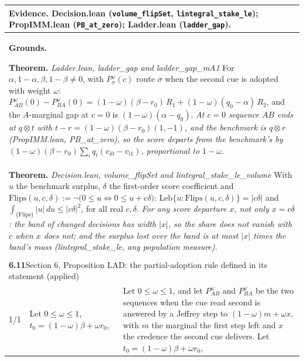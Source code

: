 \documentclass[10pt]{article}
\theoremstyle{definition}
\newlength{\fullw}\setlength{\fullw}{25.9cm}
\newcommand{\entryhead}[2]{\multicolumn{3}{|l|}{\rule{0pt}{2.6ex}\large\textbf{#1}\quad #2} \\ \hline}
\begin{document}
{\begin{longtable}{|p{0.9cm}|p{12.2cm}|p{12.2cm}|}
\multicolumn{3}{|p{\fullw}|}{\textbf{Evidence.} Decision.lean (\texttt{volume\_flipSet}, \texttt{lintegral\_stake\_le}); PropIMM.lean (\texttt{PB\_at\_zero}); Ladder.lean (\texttt{ladder\_gap}).} \\ \hline
\multicolumn{3}{|p{\fullw}|}{\textbf{Grounds.}\par \textbf{Theorem.} \textit{Ladder.lean, ladder\_gap and ladder\_gap\_mA1} \newline For $\alpha,1-\alpha,\beta,1-\beta\neq0$, with $P^{\omega}_{\sigma}(c)$ route $\sigma$ when the
second cue is adopted with weight $\omega$:
$P^{\omega}_{AB}(0)-P^{\omega}_{BA}(0)=(1-\omega)(\beta-r_0)\,R_1+(1-\omega)(q_0-\alpha)\,R_2$, and
the $A$-marginal gap at $c=0$ is $(1-\omega)(\alpha-q_0)$. \newline \textit{At $c=0$ sequence $AB$ ends at $q\otimes t$ with $t-r=(1-\omega)(\beta-r_0)(1,-1)$, and the benchmark is $q\otimes r$ (PropIMM.lean, PB\_at\_zero), so the score departs from the benchmark's by $(1-\omega)(\beta-r_0)\sum_i q_i(v_{i0}-v_{i1})$, proportional to $1-\omega$.}} \\
\multicolumn{3}{|p{\fullw}|}{\textbf{Theorem.} \textit{Decision.lean, volume\_flipSet and lintegral\_stake\_le\_volume} \newline With $u$ the benchmark surplus, $\delta$ the first-order score
coefficient and $\mathrm{Flips}(u,c,\delta) := \neg\big(0\le u \iff 0\le u + c\delta\big)$:
$\mathrm{Leb}\{u : \mathrm{Flips}(u,c,\delta)\} = |c\delta|$ and
$\int_{\{\mathrm{Flips}\}} |u|\,du \le |c\delta|^2$, for all real $c,\delta$. \newline \textit{For any score departure $x$, not only $x=c\delta$: the band of changed decisions has width $|x|$, so the share does not vanish with $c$ when $x$ does not; and the surplus lost over the band is at most $|x|$ times the band's mass (lintegral\_stake\_le, any population measure).}} \\ \hline
\multicolumn{3}{|l|}{} \\ \hline
\entryhead{6.11}{Section 6, Proposition LAD: the partial-adoption rule defined in its statement (applied)\quad{\footnotesize\textit{(formerly C.31)}}}
1/1 & Let $0\le\omega\le1$, $t_0=(1-\omega)\beta+\omega r_0$, & Let $0\le\omega\le1$, and let $P^{\omega}_{AB}$ and $P^{\omega}_{BA}$ be the two sequences when the cue read second is answered by a Jeffrey step to $(1-\omega)m+\omega x$, with $m$ the marginal the first step left and $x$ the credence the second cue delivers. Let $t_0=(1-\omega)\beta+\omega r_0$, \\ \hline

\end{longtable}}
\end{document}
